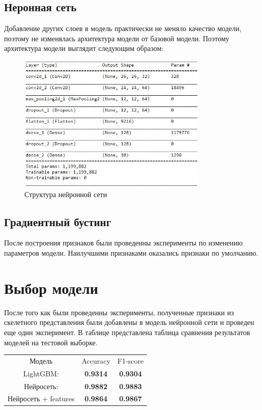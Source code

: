 \documentclass{llncs}
\begin{document}
\subsection{Неронная сеть}
Добавление других слоев в модель практически не меняло качество модели, поэтому не изменялась архитектура модели от базовой модели. Поэтому архитектура модели выглядит следующим образом:

\begin{figure}
\centering
\caption{Структура нейронной сети\label{overflow}}
\begin{center}
    \includegraphics[width=90mm]{model.jpg}
  \end{center}
\end{figure}

\subsection{Градиентный бустинг}
После построения признаков были проведенны эксперименты по изменению параметров модели. Наилучшими признаками оказались признаки по умолчанию.

\section{Выбор модели}
После того как были проведенны эксперименты, полученные признаки из скелетного представления были добавлены в модель нейронной сети и проведен еще один эксперимент.
В таблице представлена таблица сравнения результатов моделей на тестовой выборке.

\begin{table}
\label{tabular:timesandtenses}
\begin{center}
\begin{tabular}{ccc}
Модель & Accuracy & F1-score \\
LightGBM: & \textbf{0.9314} & \textbf{0.9304} \\
Нейросеть: & \textbf{0.9882} & \textbf{0.9883} \\
Нейросеть + features & \textbf{0.9864} & \textbf{0.9867} \\
\end{tabular}
\end{center}
\end{table}
\end{document}
